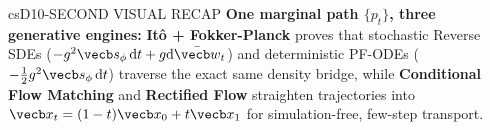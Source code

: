 \documentclass[../../../../master.tex]{subfiles}
\begin{document}
\begin{cscolumns}
\begin{cscard}{csD}{10-SECOND VISUAL RECAP}
  \sffamily\footnotesize
  \textbf{One marginal path $\{p_t\}$, three generative engines:}
  \textbf{It\^o + Fokker-Planck} proves that stochastic Reverse SDEs ($-g^2\vecb s_\phi\,\mathrm{d}t+g\mathrm{d}\bar{\vecb w}_t$) and deterministic PF-ODEs ($-\frac{1}{2}g^2\vecb s_\phi\,\mathrm{d}t$) traverse the exact same density bridge, while \textbf{Conditional Flow Matching} and \textbf{Rectified Flow} straighten trajectories into $\vecb x_t=(1-t)\vecb x_0+t\vecb x_1$ for simulation-free, few-step transport.
\end{cscard}
\end{cscolumns}

\csend
\end{document}
